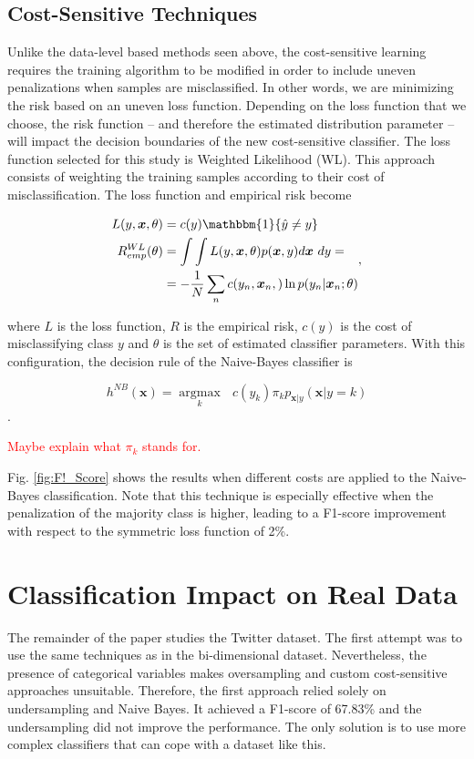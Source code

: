 \documentclass[conference]{IEEEtran}
\begin{document}
	\subsection{Cost-Sensitive Techniques}
	Unlike the data-level based methods seen above, the cost-sensitive learning requires the training algorithm to be modified in order to include uneven penalizations when samples are misclassified. In other words, we are minimizing the risk based on an uneven loss function. Depending on the loss function that we choose, the risk function -- and therefore the estimated distribution parameter -- will impact the decision boundaries of the new cost-sensitive classifier. The loss function selected for this study is Weighted Likelihood (WL). This approach consists of weighting the training samples according to their cost of misclassification. The loss function and empirical risk become
	
	\begin{equation*}
	\begin{aligned} \label{costWL}
			L(y,\boldsymbol x, \theta) &= c(y)\mathbbm{1}\{ \hat y \neq y \} \\
			R^{WL}_{emp}(\theta) &= \int \int L(y,\boldsymbol x, \theta) p(\boldsymbol x, y) d\boldsymbol x \text{ }dy=\\
				      &=-\frac{1}{N} \sum_n c(y_n,\boldsymbol x_n,) \ln p(y_n | \boldsymbol x_n;\theta)
		\end{aligned},
	\end{equation*}
	
	where $L$ is the loss function, $R$ is the empirical risk, $c(y)$ is the cost of misclassifying class $y$ and $\theta$ is the set of estimated classifier parameters. With this configuration, the decision rule of the Naive-Bayes classifier is
	
	$$ h^{NB}(\boldsymbol x) = \underset{k}{\operatorname{argmax}} \text{ } c(y_k) \pi_k p_{\boldsymbol x | y}(\boldsymbol x|y=k)$$.

\textcolor{red}{Maybe explain what $\pi_k$ stands for.}
	
	Fig. \ref{fig:F!_Score} shows the results when different costs are applied to the Naive-Bayes classification. Note that this technique is especially effective when the penalization of the majority class is higher, leading to a F1-score improvement with respect to the symmetric loss function of 2\%.
	
\section{Classification Impact on Real Data}
The remainder of the paper studies the Twitter dataset. The first attempt was to use the same techniques as in the bi-dimensional dataset. Nevertheless, the presence of categorical variables makes oversampling and custom cost-sensitive approaches unsuitable. Therefore, the first approach relied solely on undersampling and Naive Bayes. It achieved a F1-score of 67.83\% and the undersampling did not improve the performance. The only solution is to use more complex classifiers that can cope with a dataset like this.
\end{document}
